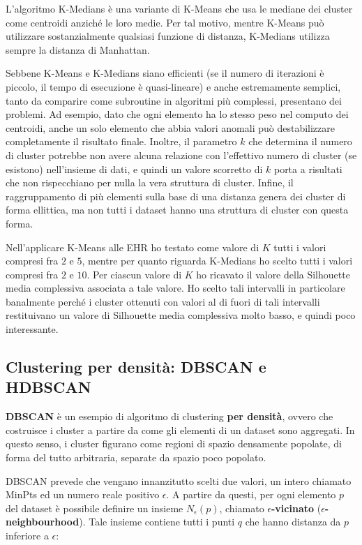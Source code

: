 \documentclass[a4paper, 12pt]{report}
\begin{document}
				L'algoritmo K-Medians è una variante di K-Means che usa le mediane dei
				cluster come centroidi anziché le loro medie. Per tal motivo, mentre
				K-Means può utilizzare sostanzialmente qualsiasi funzione di distanza,
				K-Medians utilizza sempre la distanza di Manhattan.

				Sebbene K-Means e K-Medians siano efficienti (se il numero di
				iterazioni è piccolo, il tempo di esecuzione è quasi-lineare) e
				anche estremamente semplici, tanto da comparire come subroutine
				in algoritmi più complessi, presentano dei problemi. Ad esempio,
				dato che ogni elemento ha lo stesso peso nel computo dei centroidi,
				anche un solo elemento che abbia valori anomali può destabilizzare
				completamente il risultato finale. Inoltre, il parametro $k$ che
				determina il numero di cluster potrebbe non avere alcuna relazione
				con l'effettivo numero di cluster (se esistono) nell'insieme di
				dati, e quindi un valore scorretto di $k$ porta a risultati che
				non rispecchiano per nulla la vera struttura di cluster. Infine,
				il raggruppamento di più elementi sulla base di una distanza genera
				dei cluster di forma ellittica, ma non tutti i dataset hanno una
				struttura di cluster con questa forma.

				Nell'applicare K-Means alle EHR ho testato come valore di $K$ tutti
				i valori compresi fra $2$ e $5$, mentre per quanto riguarda K-Medians
				ho scelto tutti i valori compresi fra $2$ e $10$. Per ciascun valore
				di $K$ ho ricavato il valore della Silhouette media complessiva
				associata a tale valore. Ho scelto tali intervalli in particolare
				banalmente perché i cluster ottenuti con valori al di fuori di tali
				intervalli restituivano un valore di Silhouette media complessiva
				molto basso, e quindi poco interessante.

			\subsection{Clustering per densità: DBSCAN e HDBSCAN}

				\textbf{DBSCAN} è un esempio di algoritmo di clustering \textbf{per
				densità}, ovvero che costruisce i cluster a partire da come gli
				elementi di un dataset sono aggregati. In questo senso, i cluster
				figurano come regioni di spazio densamente popolate, di forma del
				tutto arbitraria, separate da spazio poco popolato.

				DBSCAN prevede che vengano innanzitutto scelti due valori, un intero
				chiamato MinPts ed un numero reale positivo $\epsilon$. A partire da
				questi, per ogni elemento $p$ del dataset è possibile definire un
				insieme $N_{\epsilon}(p)$, chiamato $\epsilon$\textbf{-vicinato}
				($\epsilon$\textbf{-neighbourhood}). Tale insieme contiene tutti i
				punti $q$ che hanno distanza da $p$ inferiore a $\epsilon$:
\end{document}

